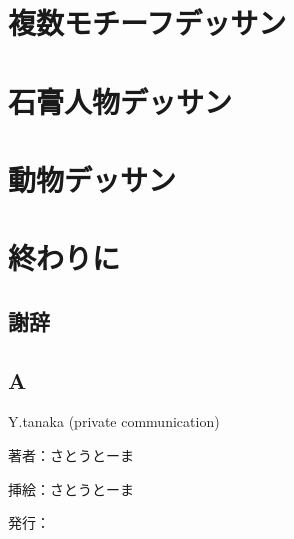 \documentclass[a4paper,11pt]{jsbook}
\begin{document}
\part{複数モチーフデッサン}

\part{石膏人物デッサン}

\part{動物デッサン}

\part{終わりに}
\chapter{謝辞}

\appendix
\chapter{A}



\begin{thebibliography}{2}

Y.tanaka (private communication)
\end{thebibliography}

\thispagestyle{empty}
\begin{flushright}
\begin{minipage}{0.5\hsize}
\begin{description}
  \item{著者：}さとうとーま
  \item{挿絵：}さとうとーま
  \item{発行：}\date{\today}
\end{description}
\end{minipage}
\end{flushright}
\end{document}
